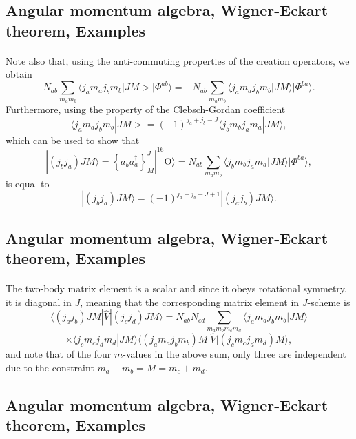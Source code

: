 \documentclass[%
twoside,                 %
final,                   %
10pt]{article}
\begin{document}
\subsection{Angular momentum algebra, Wigner-Eckart theorem, Examples}

\paragraph{}
Note also that, using the anti-commuting 
properties of the creation operators, we obtain
\[
N_{ab}\sum_{m_am_b}\langle j_am_aj_bm_b|JM>|\Phi^{ab}\rangle=-N_{ab}\sum_{m_am_b}\langle j_am_aj_bm_b|JM\rangle|\Phi^{ba}\rangle.
\]
Furthermore, using the property of the Clebsch-Gordan coefficient
\[
\langle j_am_aj_bm_b|JM>=(-1)^{j_a+j_b-J}\langle j_bm_bj_am_a|JM\rangle,
\]
which can be used to show that
\[
|(j_bj_a)JM\rangle  = \left\{a^{\dagger}_ba^{\dagger}_a\right\}^J_M|^{16}\mathrm{O}\rangle=N_{ab}\sum_{m_am_b}\langle j_bm_bj_am_a|JM\rangle|\Phi^{ba}\rangle, 
\]
is equal to 
\[
|(j_bj_a)JM\rangle=(-1)^{j_a+j_b-J+1}|(j_aj_b)JM\rangle.
\]




\subsection{Angular momentum algebra, Wigner-Eckart theorem, Examples}

\paragraph{}
The two-body matrix element is a scalar and since it obeys rotational symmetry, it is diagonal in $J$, 
meaning that the corresponding matrix element in $J$-scheme is 
\[
\langle (j_aj_b) JM | \hat{V} | (j_cj_d) JM \rangle = N_{ab}N_{cd}\sum_{m_am_bm_cm_d}\langle j_am_aj_bm_b|JM\rangle
\]
\[
\times \langle j_cm_cj_dm_d|JM\rangle\langle (j_am_aj_bm_b)M |  \hat{V} | (j_cm_cj_dm_d)M \rangle,
\]
and note that of the four $m$-values in the above sum, only three are independent due to the constraint $m_a+m_b=M=m_c+m_d$.



\subsection{Angular momentum algebra, Wigner-Eckart theorem, Examples}
\end{document}
